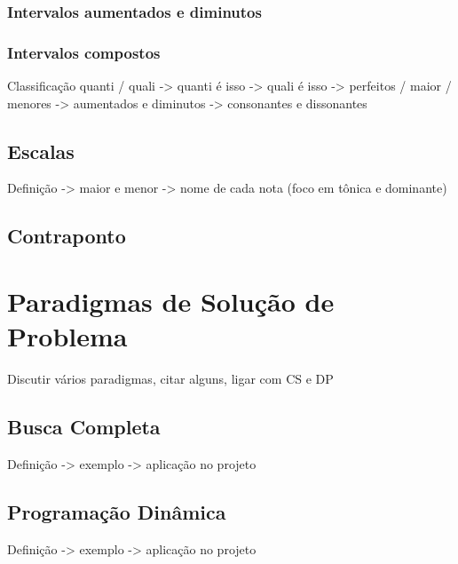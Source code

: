       \subsubsection[Intervalos Aumentados e Diminutos]{Intervalos aumentados e diminutos}
      \subsubsection[Intervalos Compostos]{Intervalos compostos}

      Classificação quanti / quali -> quanti é isso -> quali é isso -> perfeitos / maior / menores -> aumentados e diminutos -> consonantes e dissonantes

    \subsection[Escalas]{Escalas}
      Definição -> maior e menor -> nome de cada nota (foco em tônica e dominante)


    \subsection[Contraponto]{Contraponto}

  \section[Paradigmas de Solução de Problema]{Paradigmas de Solução de Problema}
    Discutir vários paradigmas, citar alguns, ligar com CS e DP

    \subsection[Busca Completa]{Busca Completa}
      Definição -> exemplo -> aplicação no projeto
    \subsection[Programação Dinâmica]{Programação Dinâmica}
      Definição -> exemplo -> aplicação no projeto
